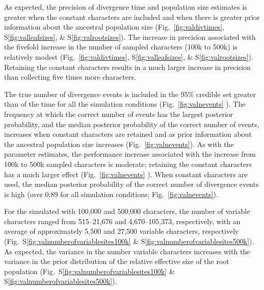 As expected, the precision of divergence time and population size estimates is
greater when the constant characters are included and when there is greater
prior information about the ancestral population size
(Fig.\ \ref{fig:valdivtimes}, S\ref{fig:valleafsizes}, \&
S\ref{fig:valrootsizes}).
The increase in precision associated with the fivefold increase in the number
of sampled characters (100k to 500k) is relatively modest (Fig.\ 
\ref{fig:valdivtimes}, S\ref{fig:valleafsizes}, \& S\ref{fig:valrootsizes}).
Retaining the constant characters results in a much larger increase in
precision than collecting five times more characters.

The true  number of divergence events is included in the
95\% credible set greater than \jroedit{98\%}{97\%} of the time for all the
simulation conditions
(Fig.~\ref{fig:valnevents} ).
The frequency at which the correct number of events has the largest posterior
probability, and the median posterior probability of the correct number of
events,
increases when constant characters are retained and as prior information about
the ancestral population size increases 
(Fig.~\ref{fig:valnevents}).
As with the parameter estimates, the performance increase associated with the
increase from 100k to 500k sampled characters is moderate; retaining the
constant characters has a much larger effect
(Fig.~\ref{fig:valnevents} ).
When constant characters are used, the median posterior
probability of the correct number of divergence events is high (over 0.89
for all simulation conditions; 
Fig.~\ref{fig:valnevents}).

\ifembed{

}{}

For the \datasets simulated with 100,000 and 500,000 characters, the number of
variable characters ranged from
515--21,676 
and
4,670--105,373,
respectively, with an average of approximately
5,500
and 
27,500 variable characters, respectively
(Fig.\ S\ref{fig:valnumberofvariablesites100k} \&
S\ref{fig:valnumberofvariablesites500k}).
As expected, the variance in the number variable characters increases with the
variance in the prior distribution of the relative effective size of the root
population
(Fig.\ S\ref{fig:valnumberofvariablesites100k} \&
S\ref{fig:valnumberofvariablesites500k}).

